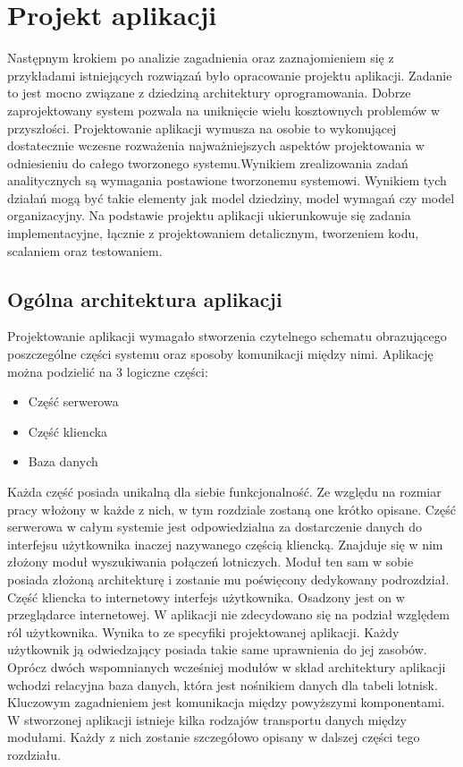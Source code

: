 \documentclass[12pt, twoside]{report}
\begin{document}
\chapter{Projekt aplikacji}
Następnym krokiem po analizie zagadnienia oraz zaznajomieniem się z przykładami istniejących rozwiązań było opracowanie projektu aplikacji. Zadanie to jest mocno związane z dziedziną architektury oprogramowania. Dobrze zaprojektowany system pozwala na uniknięcie wielu kosztownych problemów w przyszłości. Projektowanie aplikacji wymusza na osobie to wykonującej dostatecznie wczesne rozważenia najważniejszych aspektów projektowania w odniesieniu do całego tworzonego systemu.\cite{architektura}Wynikiem zrealizowania zadań analitycznych są wymagania postawione tworzonemu systemowi. Wynikiem tych działań mogą być takie elementy jak model dziedziny, model wymagań czy model organizacyjny. Na podstawie projektu aplikacji ukierunkowuje się zadania implementacyjne, łącznie z projektowaniem detalicznym, tworzeniem kodu, scalaniem oraz testowaniem.


\section{Ogólna architektura aplikacji}
Projektowanie aplikacji wymagało stworzenia czytelnego schematu obrazującego poszczególne części systemu oraz sposoby komunikacji między nimi.
Aplikację można podzielić na 3 logiczne części: 
\begin{itemize}[noitemsep,topsep=0pt]
\item Część serwerowa
\item Część kliencka
\item Baza danych 
\end{itemize}
Każda część posiada unikalną dla siebie funkcjonalność. 
Ze względu na rozmiar pracy włożony w każde z nich, w tym rozdziale zostaną one krótko opisane.
Część serwerowa w całym systemie jest odpowiedzialna za dostarczenie danych do interfejsu użytkownika inaczej nazywanego częścią kliencką. Znajduje się w nim złożony moduł wyszukiwania połączeń lotniczych. Moduł ten sam w sobie posiada złożoną architekturę i  zostanie mu poświęcony dedykowany podrozdział.
Część kliencka to internetowy interfejs użytkownika. Osadzony jest on w przeglądarce internetowej. W aplikacji nie zdecydowano się na podział względem ról użytkownika. Wynika to ze specyfiki projektowanej aplikacji. Każdy użytkownik ją odwiedzający posiada takie same uprawnienia do jej zasobów.
Oprócz dwóch wspomnianych wcześniej modułów w skład architektury aplikacji wchodzi relacyjna baza danych, która jest nośnikiem danych dla tabeli lotnisk.
Kluczowym zagadnieniem jest komunikacja między powyższymi komponentami. W stworzonej aplikacji istnieje kilka rodzajów transportu danych między modułami. Każdy z nich zostanie szczegółowo opisany w dalszej części tego rozdziału.
\end{document}
